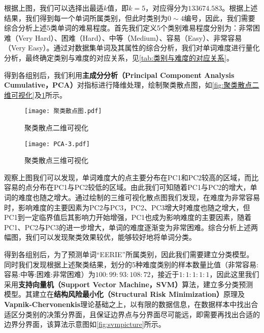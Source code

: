\documentclass{MathModeling}
\begin{document}
	根据上图，我们可以选择出最适$k$值，即$k=5$，对应得分为$133674.583$。根据上述结果，我们得到每一个单词所属类别，但此时类别为$0\sim4$编号，因此，我们需要综合分析上述5类单词的难易程度。首先我们定义5个类别难易程度分别为：非常困难（Very Hard）、困难（Hard）、中等（Medium）、容易（Easy）、非常容易（Very Easy）。通过对数据集单词及其属性的综合分析，我们对单词难度进行量化分析，最终确定类别与难度的对应关系，见\textcolor{blue}{\cref{tab:类别与难度的对应关系}}。

\begin{table}[H]
	\centering
	\caption{类别与难度的对应关系}
	\label{tab:类别与难度的对应关系}
\end{table}

	得到各组别后，我们利用\textbf{主成分分析（Principal Component Analysis Cumulative，PCA）}对指标进行降维处理，绘制聚类散点图，如\textcolor{blue}{\cref{fig:聚类散点二维可视化}}及\textcolor{blue}{\cref{fig:聚类散点三维可视化}}所示。
	
	\begin{figure}[H]
		\centering
		\begin{minipage}{0.48\linewidth}
			\centering
			\texttt{[image: 聚类散点图.pdf]}
			\caption{聚类散点二维可视化}
			\label{fig:聚类散点二维可视化}
		\end{minipage}
		\begin{minipage}{0.48\linewidth}
			\centering
			\texttt{[image: PCA-3.pdf]}
			\caption{聚类散点三维可视化}
			\label{fig:聚类散点三维可视化}
		\end{minipage}
	\end{figure}
	观察上图我们可以发现，单词难度大的点主要分布在PC1和PC2较高的区域，而比容易的点分布在PC1与PC2较低的区域。由此我们可知随着PC1与PC2的增大，单词的难度也随之增大。通过绘制的三维可视化散点图我们发现，在难度为非常容易时，影响难度的主要因素为PC2与PC3，PC2、PC3增大时难度也随之增大，但PC1到一定临界值后其影响力开始增强，PC1也成为影响难度的主要因素，随着PC1、PC2与PC3的进一步增大，单词的难度逐渐变为非常困难。综合分析上述两幅图，我们可以发现聚类效果较优，能够较好地将单词分类。

	得到各组别后，为了预测单词“EERIE”所属类别，因此我们需要建立分类模型。同时我们发现根据上述聚类结果，划分的5种难度类别的样本数量比值（非常容易:容易:中等:困难:非常困难）为$100:99:93:108:72$，接近于$1:1:1:1:1$，因此这里我们采用\textbf{支持向量机（Support Vector Machine，SVM）}算法，建立多分类预测模型。其建立在\textbf{结构风险最小化（Structural Risk Minimization）}原理及\textbf{Vapnik-Chervonenkis}理论基础之上\textcolor{blue}{\cite{psvm}}，以有限的数据信息，在数据样本中找出合适区分类别的决策分界面，且保证边界点与分界面尽可能远，即需要再找出合适的边界分界面，该算法示意图如\textcolor{blue}{\cref{fig:svmpicture}}所示。
\end{document}
